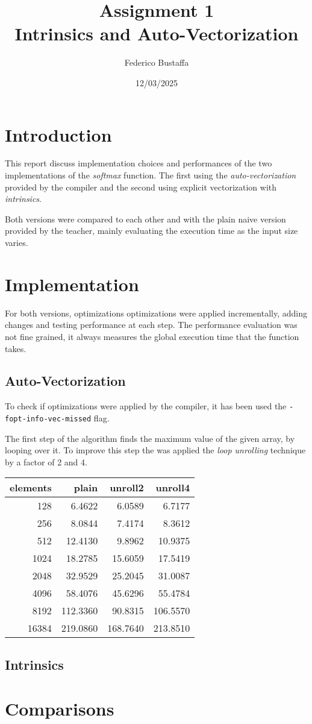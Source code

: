 \documentclass[12pt, a4paper]{article}
\title{Assignment 1\\Intrinsics and Auto-Vectorization}
\author{Federico Bustaffa}
\date{12/03/2025}
\begin{document}
\maketitle
\tableofcontents

\section{Introduction}

This report discuss implementation choices and performances of the two
implementations of the \textit{softmax} function. The first using the
\textit{auto-vectorization} provided by the compiler and the second using
explicit vectorization with \textit{intrinsics}.

Both versions were compared to each other and with the plain naive version
provided by the teacher, mainly evaluating the execution time as the input size
varies.

\section{Implementation}

For both versions, optimizations optimizations were applied incrementally,
adding changes and testing performance at each step. The performance evaluation
was not fine grained, it always measures the global execution time that the
function takes.

\subsection{Auto-Vectorization}

To check if optimizations were applied by the compiler, it has been used the
\verb|-fopt-info-vec-missed| flag.

The first step of the algorithm finds the maximum value of the given array, by
looping over it. To improve this step the was applied the \textit{loop unrolling}
technique by a factor of 2 and 4.

\begin{table}[H]
	\centering
\begin{tabular}{rrrr}
\toprule
elements & plain & unroll2 & unroll4 \\
\midrule
128 & 6.4622 & 6.0589 & 6.7177 \\
256 & 8.0844 & 7.4174 & 8.3612 \\
512 & 12.4130 & 9.8962 & 10.9375 \\
1024 & 18.2785 & 15.6059 & 17.5419 \\
2048 & 32.9529 & 25.2045 & 31.0087 \\
4096 & 58.4076 & 45.6296 & 55.4784 \\
8192 & 112.3360 & 90.8315 & 106.5570 \\
16384 & 219.0860 & 168.7640 & 213.8510 \\
\bottomrule
\end{tabular}
\end{table}

\subsection{Intrinsics}

\section{Comparisons}
\end{document}
